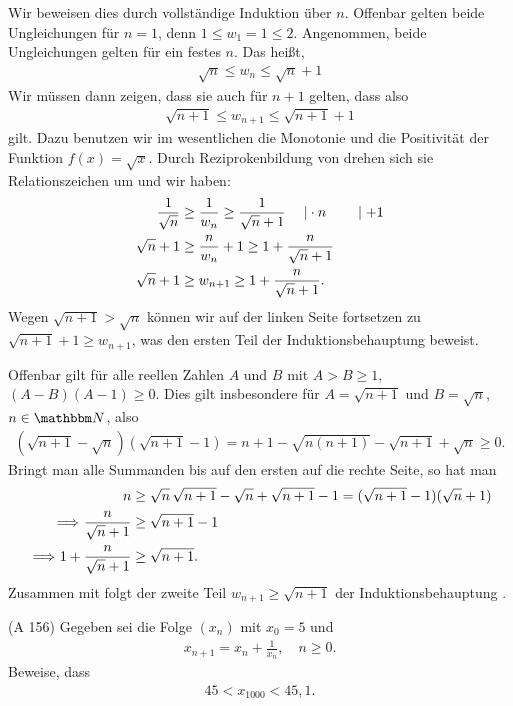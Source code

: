 \documentclass[11pt,a4paper]{article}
\begin{document}
\begin{beweis} Wir beweisen dies durch vollständige Induktion über $n$.
Offenbar gelten beide Ungleichungen für $n=1$, denn $1 \le w_1 =1 \le 2$.
Angenommen, beide Ungleichungen gelten für ein festes $n$.  Das heißt,
\begin{align}\label{u-1}
\sqrt{n} \le w_{n} \le \sqrt{n} +1
\end{align}
Wir müssen dann zeigen, dass sie auch für $n+1$ gelten, dass also
\begin{align}\label{u-2}
\sqrt{n+1} \le w_{n+1} \le \sqrt{n+1} +1
\end{align}
gilt.  Dazu benutzen wir im wesentlichen die Monotonie und die Positivität der
Funktion $f(x)=\sqrt{x}$. Durch Reziprokenbildung von \rf[u-1] drehen sich sie
Relationszeichen um und wir haben:
\begin{align}
\frac{1}{\sqrt{n}}& \ge \frac{1}{w_n} \ge \frac{1}{\sqrt{n} +1} 
\quad \left. \right| \cdot n \quad \quad  \mid +1  \nonumber\\
\sqrt{n} +1 &\ge \frac{n}{w_n}+ 1 \ge 1+\frac{n}{\sqrt{n} +1} \nonumber \\ 
\sqrt{n} +1 &\ge w_{n+1} \ge 1+\frac{n}{\sqrt{n} +1}.
\label{u-3}
\end{align}
Wegen $\sqrt{n+1}> \sqrt{n} $ können wir auf der linken Seite fortsetzen zu
$\sqrt{n+1} +1 \ge w_{n+1}$, was den ersten Teil der Induktionsbehauptung
\rf[u-2] beweist.

Offenbar gilt für alle reellen Zahlen $A$ und $B$ mit $A>B\ge 1$,
$(A-B)(A-1)\ge 0$. Dies gilt insbesondere für $A=\sqrt{n+1}$ und $B=\sqrt{n}$,
$n\in\N$, also
\begin{gather*}
(\sqrt{n+1}-\sqrt{n})(\sqrt{n+1} -1)=n+1 -\sqrt{n(n+1)} -\sqrt{n+1} +\sqrt{n}
  \ge 0. 
\end{gather*}
Bringt man alle Summanden bis auf den ersten auf die rechte Seite, so hat man
\begin{align*}
n&\ge \sqrt{n}\, \sqrt{n+1} -\sqrt{n} +\sqrt{n+1} -1 =
(\sqrt{n+1} -1)(\sqrt{n} +1)\\
{\,\,\Longrightarrow}\,\, \frac{n}{\sqrt{n} +1} &\ge \sqrt{n+1} -1\\
{\,\,\Longrightarrow}\,\, 1+  \frac{n}{\sqrt{n} +1} &\ge \sqrt{n+1} .
\end{align*}
Zusammen mit \rf[u-3] folgt der zweite Teil $w_{n+1} \ge \sqrt{n+1} $ der
Induktionsbehauptung \rf[u-2].
\end{beweis}

\begin{aufgabe} (A 156)  Gegeben sei die Folge $(x_n)$ mit $x_0=5$ und 
\begin{gather*}
x_{n+1} = x_n +\frac{1}{x_n}, \quad n\ge 0.
\end{gather*}
Beweise, dass
\begin{gather*}
45 < x_{1000} < 45{,}1.
\end{gather*}
\end{aufgabe}
\end{document}
